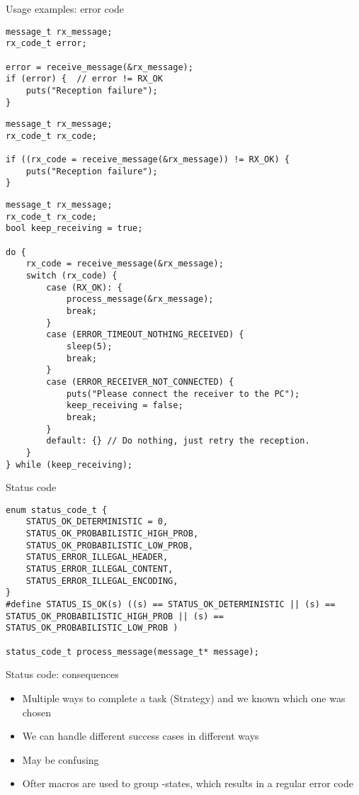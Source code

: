 \documentclass[aspectratio=169,14pt]{beamer}
\begin{document}
\begin{frame}[fragile]{Usage examples: error code}
\begin{lstlisting}[style=cstyle]
message_t rx_message;
rx_code_t error;

error = receive_message(&rx_message);
if (error) {  // error != RX_OK
    puts("Reception failure");
}
\end{lstlisting}

\begin{lstlisting}[style=cstyle]
message_t rx_message;
rx_code_t rx_code;

if ((rx_code = receive_message(&rx_message)) != RX_OK) {
    puts("Reception failure");
}
\end{lstlisting}
\end{frame}

\begin{frame}[fragile]{}
\begin{lstlisting}[style=cstyle,basicstyle=\scriptsize\ttfamily]
message_t rx_message;
rx_code_t rx_code;
bool keep_receiving = true;

do {
    rx_code = receive_message(&rx_message);
    switch (rx_code) {
        case (RX_OK): {
            process_message(&rx_message);
            break;
        }
        case (ERROR_TIMEOUT_NOTHING_RECEIVED) {
            sleep(5);
            break;
        }
        case (ERROR_RECEIVER_NOT_CONNECTED) {
            puts("Please connect the receiver to the PC");
            keep_receiving = false;
            break;
        }
        default: {} // Do nothing, just retry the reception.
    }
} while (keep_receiving);
\end{lstlisting}
\end{frame}


\begin{frame}[fragile]{Status code}
\begin{lstlisting}[style=cstyle]
enum status_code_t {
    STATUS_OK_DETERMINISTIC = 0,
    STATUS_OK_PROBABILISTIC_HIGH_PROB,
    STATUS_OK_PROBABILISTIC_LOW_PROB,
    STATUS_ERROR_ILLEGAL_HEADER,
    STATUS_ERROR_ILLEGAL_CONTENT,
    STATUS_ERROR_ILLEGAL_ENCODING,
}
#define STATUS_IS_OK(s) ((s) == STATUS_OK_DETERMINISTIC || (s) == STATUS_OK_PROBABILISTIC_HIGH_PROB || (s) == STATUS_OK_PROBABILISTIC_LOW_PROB )

status_code_t process_message(message_t* message);
\end{lstlisting}
\end{frame}


\begin{frame}[fragile]{Status code: consequences}
\begin{itemize}
    \item Multiple ways to complete a task (Strategy) and we known which one was chosen
    \item We can handle different success cases in different ways
    \item May be confusing
    \item Ofter macros are used to group -states, which results in a regular error code
\end{itemize}
\end{frame}
\end{document}
